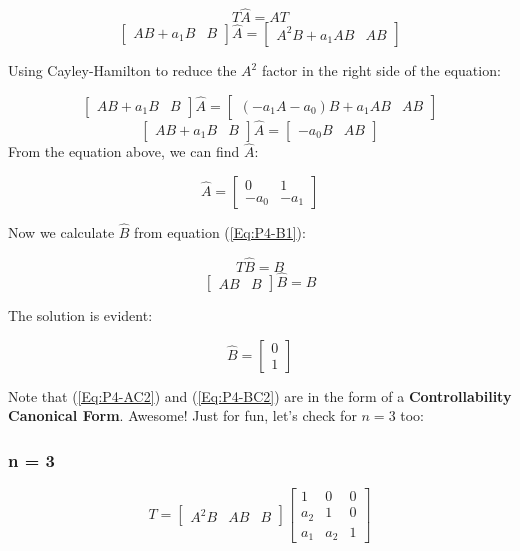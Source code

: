 \documentclass[10pt,a4paper]{article}
\begin{document}
\[ T\hat{A} = AT \]
\[
\begin{bmatrix}
AB + a_{1}B & B 
\end{bmatrix}
\hat{A} =
\begin{bmatrix}
A^{2}B + a_{1}AB & AB 
\end{bmatrix}
\]

Using Cayley-Hamilton to reduce the $A^{2}$ factor in the right side of the equation:

\[
\begin{bmatrix}
AB + a_{1}B & B 
\end{bmatrix}
\hat{A} =
\begin{bmatrix}
(-a_{1}A-a_{0})B + a_{1}AB & AB 
\end{bmatrix}
\]
\[
\begin{bmatrix}
AB + a_{1}B & B 
\end{bmatrix}
\hat{A} =
\begin{bmatrix}
-a_{0}B & AB 
\end{bmatrix}
\]
From the equation above, we can find $\hat{A}$:


\begin{equation}
\hat{A} =
\begin{bmatrix}
0 & 1 \\
-a_{0} & -a_{1} 
\end{bmatrix}
\label{Eq:P4-AC2} 
\end{equation}

Now we calculate $\hat{B}$ from equation (\ref{Eq:P4-B1}):

\[ T\hat{B} = B \]
\[ \begin{bmatrix}
AB & B
\end{bmatrix}
\hat{B} = 
B \]

The solution is evident:

\begin{equation}
\hat{B} = 
\begin{bmatrix}
0 \\
1
\end{bmatrix}
\label{Eq:P4-BC2}
\end{equation}

Note that (\ref{Eq:P4-AC2}) and (\ref{Eq:P4-BC2}) are in the form of a  \textbf{Controllability Canonical Form}. Awesome! Just for fun, let's check for $n = 3$ too:

\subsubsection*{n = 3}

\[
T = 
\begin{bmatrix}
A^{2}B & AB & B
\end{bmatrix}
\begin{bmatrix}
1 & 0 & 0\\
a_{2} & 1 & 0 \\
a_{1} & a_{2} & 1
\end{bmatrix}
\]
\end{document}
